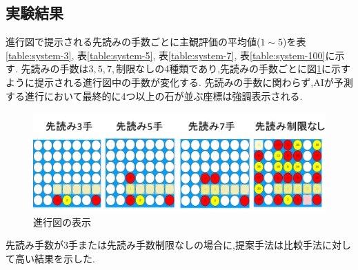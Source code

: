 \subsection{実験結果}
進行図で提示される先読みの手数ごとに主観評価の平均値($1\sim5$)を表\ref{table:system-3}, 表\ref{table:system-5}, 表\ref{table:system-7}, 表\ref{table:system-100}に示す.
先読みの手数は${3, 5, 7, \textrm{制限なし}}$の4種類であり,先読みの手数ごとに図\ref{fig:see}に示すように提示される進行図中の手数が変化する.
先読みの手数に関わらず,AIが予測する進行において最終的に4つ以上の石が並ぶ座標は強調表示される.
\begin{figure}[t]
    \centering
    \includegraphics[width=\linewidth]{./figure/see.png}
	\caption{進行図の表示}
	\label{fig:see}
\end{figure}
先読み手数が3手または先読み手数制限なしの場合に,提案手法は比較手法に対して高い結果を示した.
\begin{table}[H]
    \caption{先読み手数３手の場合}
    \label{table:system-3}
    \scriptsize
    \centering
    
\end{table}
